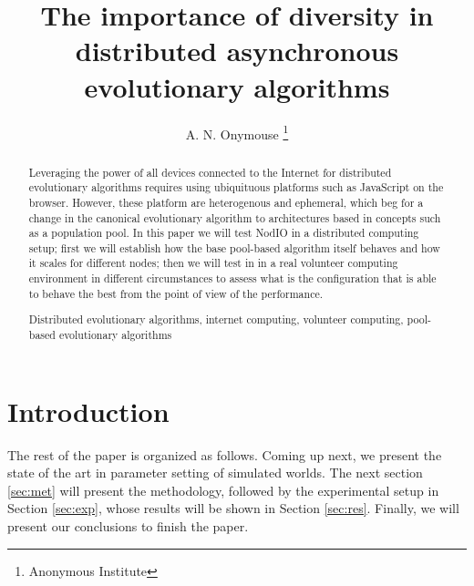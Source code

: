 \documentclass[runningheads,a4paper]{llncs}
\newcommand{\keywords}[1]{\par\addvspace\baselineskip
\noindent\keywordname\enspace\ignorespaces#1}
\begin{document}
\mainmatter  

\title{The importance of diversity in distributed asynchronous evolutionary algorithms} 


\author{A. N. Onymouse%
\thanks{Anonymous Institute}}
%




\maketitle

\begin{abstract}

Leveraging the power of all devices connected to the Internet for
distributed evolutionary algorithms requires using ubiquituous
platforms such as JavaScript on the browser. However, these platform
are heterogenous and ephemeral, which beg for a change in the canonical
evolutionary algorithm to architectures based in concepts such as a
population pool. In this paper we will test NodIO in a distributed
computing setup; first we will establish how the base pool-based algorithm itself
behaves and how it scales for different nodes; then we will test in in
a real volunteer computing environment in different circumstances to
assess what is the configuration that is able to behave the best from
the point of view of the performance. 

\keywords{Distributed evolutionary algorithms, internet computing,
  volunteer computing, pool-based evolutionary algorithms}
\end{abstract}

\section{Introduction}

The rest of the paper is organized as follows. Coming up next, we
present the state of the art in parameter setting of simulated
worlds. The next section \ref{sec:met} will present the methodology,
followed by the experimental setup in Section \ref{sec:exp}, whose results will be shown in Section \ref{sec:res}. Finally, we will
present our conclusions to finish the paper.
\end{document}
